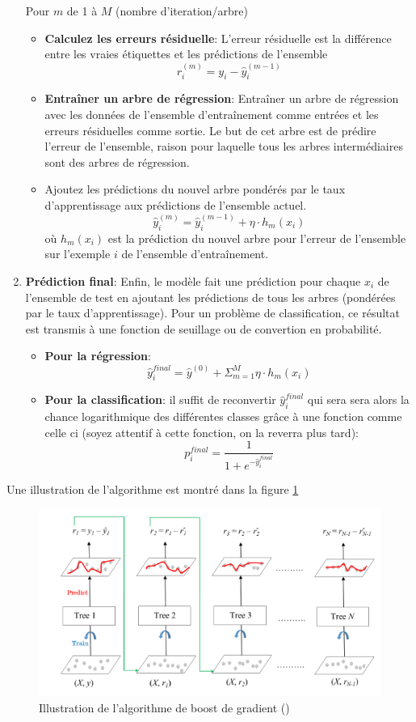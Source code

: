 \begin{enumerate}
    Pour \(m\) de 1 à \(M\) (nombre d'iteration/arbre)
    \begin{itemize}
        \item \textbf{Calculez les erreurs résiduelle}: L'erreur résiduelle est la différence entre les vraies étiquettes et les prédictions de l'ensemble\[r_i^{(m)} = y_i - \hat{y}_i^{(m-1)}\]
        \item \textbf{Entraîner un arbre de régression}: Entraîner un arbre de régression avec les données de l'ensemble d'entraînement comme entrées et les erreurs résiduelles comme sortie. Le but de cet arbre est de prédire l'erreur de l'ensemble, raison pour laquelle tous les arbres intermédiaires sont des arbres de régression.
        \item Ajoutez les prédictions du nouvel arbre pondérés par le taux d'apprentissage aux prédictions de l'ensemble actuel. \[\hat{y}_i^{(m)} = \hat{y}_i^{(m-1)} + \eta \cdot h_m(x_i)\] où \(h_m(x_i)\) est la prédiction du nouvel arbre pour l'erreur de l'ensemble sur l'exemple \(i\) de l'ensemble d'entraînement.
    \end{itemize}
    
    \item \textbf{Prédiction final}: Enfin, le modèle fait une prédiction pour chaque \(x_i\) de l'ensemble de test en ajoutant les prédictions de tous les arbres (pondérées par le taux d'apprentissage). Pour un problème de classification, ce résultat est transmis à une fonction de seuillage ou de convertion en probabilité.
    \begin{itemize}
        \item \textbf{Pour la régression}: \[\hat{y}_i^{final} = \hat{y}^{(0)} + \Sigma_{m=1}^M \eta \cdot h_m(x_i)\]
        \item \textbf{Pour la classification}: il suffit de reconvertir \(\hat{y}_i^{final}\) qui sera sera alors la chance logarithmique des différentes classes grâce à une fonction comme celle ci (soyez attentif à cette fonction, on la reverra plus tard): \[p_i^{final} = \frac{1}{1 + e^{-\hat{y}_i^{final}}}\]
    \end{itemize}
\end{enumerate}

Une illustration de l'algorithme est montré dans la figure \ref{fig:fig6}

\begin{figure}
    \centering
    \includegraphics[width=0.75\linewidth]{images/gradientboosting.png}
    \caption{Illustration de l'algorithme de boost de gradient (\cite{geeksforgeeks2023gradient})}
    \label{fig:fig6}
\end{figure}

